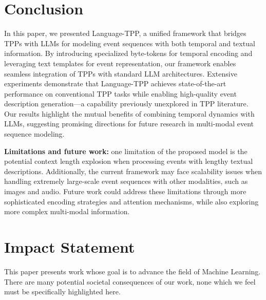 

\section{Conclusion}

In this paper, we presented Language-TPP, a unified framework that bridges TPPs with LLMs for modeling event sequences with both temporal and textual information. By introducing specialized byte-tokens for temporal encoding and leveraging text templates for event representation, our framework enables seamless integration of TPPs with standard LLM architectures. Extensive experiments demonstrate that Language-TPP achieves state-of-the-art performance on conventional TPP tasks while enabling high-quality event description generation—a capability previously unexplored in TPP literature. Our results highlight the mutual benefits of combining temporal dynamics with LLMs, suggesting promising directions for future research in multi-modal event sequence modeling.

\textbf{Limitations and future work:} one limitation of the proposed model is the potential context length explosion when processing events with lengthy textual descriptions. Additionally, the current framework may face scalability issues when handling extremely large-scale event sequences with other modalities, such as images and audio. Future work could address these limitations through more sophisticated encoding strategies and attention mechanisms, while also exploring more complex multi-modal information.%


\section*{Impact Statement}
This paper presents work whose goal is to advance the field of Machine Learning. There are many potential societal consequences of our work, none which we feel must be specifically highlighted here.